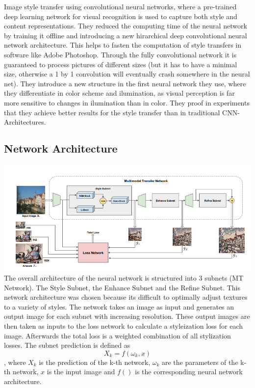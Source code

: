\documentclass[11pt]{article}
\makeatletter
\def\maxwidth{\ifdim\Gin@nat@width>\linewidth\linewidth
    \else\Gin@nat@width\fi}
\let\Oldincludegraphics\includegraphics
\renewcommand{\includegraphics}[1]{\Oldincludegraphics[width=.8\maxwidth]{#1}}
\makeatother
\begin{document}
Image style transfer using convolutional neural networks, where a
pre-trained deep learning network for visual recognition is used to
capture both style and content representations. They reduced the
computing time of the neural network by training it offline and
introducing a new hirarchical deep convolutional neural network
architecture. This helps to fasten the computation of style transfers in
software like Adobe Photoshop. Through the fully convolutional network
it is guaranteed to process pictures of different sizes (but it has to
have a minimal size, otherwise a 1 by 1 convolution will eventually
crash somewhere in the neural net). They introduce a new structure in
the first neural network they use, where they differentiate in color
scheme and ilumination, as visual perception is far more sensitive to
changes in ilumination than in color. They proof in experiments that
they achieve better results for the style transfer than in traditional
CNN-Architectures.

    \subsection{Network Architecture}\label{network-architecture}

\includegraphics{overarch.png} The overall architecture of the neural
network is structured into 3 subnets (MT Network). The Style Subnet, the
Enhance Subnet and the Refine Subnet. This network architecture was
chosen because its difficult to optimally adjust textures to a variety
of styles. The network takes an image as input and generates an output
image for each subnet with increasing resolution. These output images
are then taken as inputs to the loss network to calculate a styleization
loss for each image. Afterwards the total loss is a weighted combination
of all stylization losses. The subnet prediction is defined as
\[X_k= f(\omega_k, x)\], where \(X_k\) is the prediction of the k-th
network, \(\omega_k\) are the parameters of the k-th network, \(x\) is
the input image and \(f()\) is the corresponding neural network
architecture.
\end{document}
